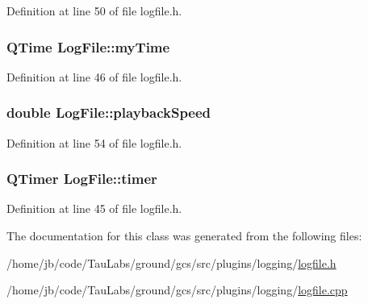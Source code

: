 \-Definition at line 50 of file logfile.\-h.

\hypertarget{class_log_file_ac0bbc6cc818c7e061a98b586f967d8da}{
\subsubsection[{my\-Time}]{\setlength{\rightskip}{0pt plus 5cm}\-Q\-Time {\bf \-Log\-File\-::my\-Time}}}\label{class_log_file_ac0bbc6cc818c7e061a98b586f967d8da}


\-Definition at line 46 of file logfile.\-h.

\hypertarget{class_log_file_a353850a88290b049a84fc18783a99099}{
\subsubsection[{playback\-Speed}]{\setlength{\rightskip}{0pt plus 5cm}double {\bf \-Log\-File\-::playback\-Speed}}}\label{class_log_file_a353850a88290b049a84fc18783a99099}


\-Definition at line 54 of file logfile.\-h.

\hypertarget{class_log_file_a0d87ba8e55632876b82a820c895ad549}{
\subsubsection[{timer}]{\setlength{\rightskip}{0pt plus 5cm}\-Q\-Timer {\bf \-Log\-File\-::timer}}}\label{class_log_file_a0d87ba8e55632876b82a820c895ad549}


\-Definition at line 45 of file logfile.\-h.



\-The documentation for this class was generated from the following files\-:\begin{DoxyCompactItemize}
\item 
/home/jb/code/\-Tau\-Labs/ground/gcs/src/plugins/logging/\hyperlink{logfile_8h}{logfile.\-h}\item 
/home/jb/code/\-Tau\-Labs/ground/gcs/src/plugins/logging/\hyperlink{logfile_8cpp}{logfile.\-cpp}\end{DoxyCompactItemize}
